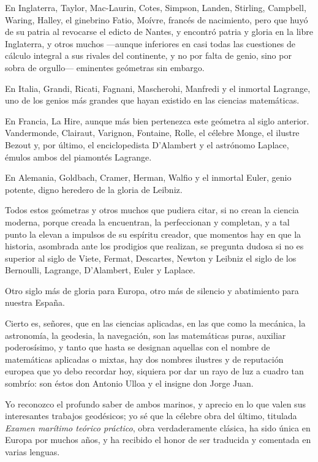 \documentclass[a4paper, 12pt]{article}
\begin{document}
{{{{En Inglaterra, Taylor, Mac-Laurin, Cotes, Simpson, Landen, Stirling, Campbell, Waring, Halley, el ginebrino Fatio, Moívre, francés de nacimiento, pero que huyó de su patria al revocarse el edicto de Nantes, y encontró patria y gloria en la libre Inglaterra, y otros muchos  ---aunque inferiores en casi todas las cuestiones de cálculo integral a sus rivales del continente, y no por falta de genio, sino por sobra de orgullo--- eminentes geómetras sin embargo.

En Italia, Grandi, Ricati, Fagnani, Mascherohi, Manfredi y el inmortal Lagrange, uno de los genios más grandes que hayan existido en las ciencias matemáticas.

En Francia, La Hire, aunque más bien pertenezca este geómetra al siglo anterior.  Vandermonde, Clairaut, Varignon, Fontaine, Rolle, el célebre Monge, el ilustre Bezout y, por último, el enciclopedista D'Alambert y el astrónomo Laplace, émulos ambos del piamontés Lagrange.

En Alemania, Goldbach, Cramer, Herman, Walfio y el inmortal Euler, genio potente, digno heredero de la gloria de Leibniz.

Todos estos geómetras y otros muchos que pudiera citar, si no crean la ciencia moderna, porque creada la encuentran, la perfeccionan y completan, y a tal punto la elevan a impulsos de su espíritu creador, que momentos hay en que la historia, asombrada ante los prodigios que realizan, se pregunta dudosa si no es superior al siglo de Viete, Fermat, Descartes, Newton y Leibniz el siglo de los Bernoulli, Lagrange, D'Alambert, Euler y Laplace.

Otro siglo más de gloria para Europa, otro más de silencio y abatimiento para nuestra España.

Cierto es, señores, que en las ciencias aplicadas, en las que como la mecánica, la astronomía, la geodesia, la navegación, son las matemáticas puras, auxiliar poderosísimo, y tanto que hasta se designan aquellas con el nombre de matemáticas aplicadas o mixtas, hay dos nombres ilustres y de reputación europea que yo debo recordar hoy, siquiera por dar un rayo de luz a cuadro tan sombrío: son éstos don Antonio Ulloa y el insigne don Jorge Juan.

Yo reconozco el profundo saber de ambos marinos, y aprecio en lo que valen sus interesantes trabajos geodésicos; yo sé que la célebre obra del último, titulada {\it Examen marítimo teórico práctico}, obra verdaderamente clásica, ha sido única en Europa por muchos años, y ha recibido el honor de ser traducida y comentada en varias lenguas.

}}}}
\end{document}
